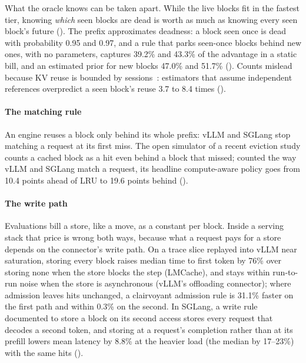 What the oracle knows can be taken apart. While the live blocks fit in the fastest tier, knowing \emph{which}
seen blocks are dead is worth as much as knowing every seen block's future (). The prefix
approximates deadness: a block seen once is dead with probability 0.95 and 0.97, and a rule that parks
seen-once blocks behind new ones, with no parameters, captures 39.2\% and 43.3\% of the advantage in a static
bill, and an estimated prior for new blocks 47.0\% and 51.7\% (). Counts mislead because KV
reuse is bounded by sessions~\cite{liu2026fancyeviction}: estimators that assume independent references
overpredict a seen block's reuse 3.7 to 8.4 times ().

\paragraph{The matching rule} An engine reuses a block only behind its whole prefix: vLLM and SGLang stop
matching a request at its first miss. The open simulator of a recent eviction study counts a cached block as a
hit even behind a block that missed; counted the way vLLM and SGLang match a request, its headline
compute-aware policy goes from 10.4 points ahead of LRU to 19.6 points behind ().

\paragraph{The write path} Evaluations bill a store, like a move, as a constant per block. Inside a serving stack
that price is wrong both ways, because what a request pays for a store depends on the connector's write path.
On a trace slice replayed into vLLM near saturation, storing every block raises median time to first token by
76\% over storing none when the store blocks the step (LMCache), and stays within run-to-run noise when the
store is asynchronous (vLLM's offloading connector); where admission leaves hits unchanged, a clairvoyant
admission rule is 31.1\% faster on the first path and within 0.3\% on the second. In SGLang, a write rule
documented to store a block on its second access stores every request that decodes a second token, and storing
at a request's completion rather than at its prefill lowers mean latency by 8.8\% at the heavier load (the
median by 17--23\%) with the same hits ().


